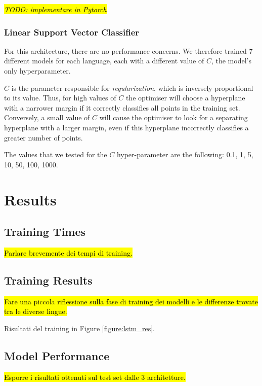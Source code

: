\documentclass[letterpaper,11pt]{article}
\begin{document}
\hl{\textit{TODO: implementare in Pytorch}}

\subsubsection*{Linear Support Vector Classifier}

For this architecture, there are no performance concerns. We therefore trained 7 different models for each language, each with a different value of $C$, the model's only hyperparameter.

$C$ is the parameter responsible for \textit{regularization}, which is inversely proportional to its value. Thus, for high values of $C$ the optimiser will choose a hyperplane with a narrower margin if it correctly classifies all points in the training set. Conversely, a small value of $C$ will cause the optimiser to look for a separating hyperplane with a larger margin, even if this hyperplane incorrectly classifies a greater number of points. 

The values that we tested for the $C$ hyper-parameter are the following: 0.1, 1, 5, 10, 50, 100, 1000.



\section{Results}
\label{sec:results}

\subsection{Training Times}

\hl{Parlare brevemente dei tempi di training.}

\subsection{Training Results}

\hl{Fare una piccola riflessione sulla fase di training dei modelli e le differenze trovate tra le diverse lingue.}

Risultati del training in Figure \ref{figure:lstm_res}.

\subsection{Model Performance}

\hl{Esporre i risultati ottenuti sul test set dalle 3 architetture.}
\end{document}
